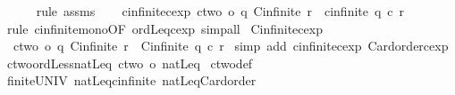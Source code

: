 \begin{isabellebody}
\ \ \ \ \isamarkupfalse%
\ {\isacharparenleft}{\kern0pt}rule\ assms{\isacharparenleft}{\kern0pt}{}{\isacharparenright}{\kern0pt}{\isacharparenright}{\kern0pt}\isanewline
\ \ \isamarkupfalse%
\isanewline
{}\isamarkupfalse%
%
\endisatagproof
{\isafoldproof}%
%
\isadelimproof
\isanewline
%
\endisadelimproof
\isanewline
{}\isamarkupfalse%
\ cinfinite{\isacharunderscore}{\kern0pt}cexp{\isacharcolon}{\kern0pt}\ {\isachardoublequoteopen}{\isasymlbrakk}ctwo\ {\isasymle}o\ q{\isacharsemicolon}{\kern0pt}\ Cinfinite\ r{\isasymrbrakk}\ {\isasymLongrightarrow}\ cinfinite\ {\isacharparenleft}{\kern0pt}q\ {\isacharcircum}{\kern0pt}c\ r{\isacharparenright}{\kern0pt}{\isachardoublequoteclose}\isanewline
%
\isadelimproof
%
\endisadelimproof
%
\isatagproof
{}\isamarkupfalse%
\ {\isacharparenleft}{\kern0pt}rule\ cinfinite{\isacharunderscore}{\kern0pt}mono{\isacharbrackleft}{\kern0pt}OF\ ordLeq{\isacharunderscore}{\kern0pt}cexp{}{\isacharbrackright}{\kern0pt}{\isacharparenright}{\kern0pt}\ simp{\isacharunderscore}{\kern0pt}all%
\endisatagproof
{\isafoldproof}%
%
\isadelimproof
\isanewline
%
\endisadelimproof
\isanewline
{}\isamarkupfalse%
\ Cinfinite{\isacharunderscore}{\kern0pt}cexp{\isacharcolon}{\kern0pt}\isanewline
\ \ {\isachardoublequoteopen}{\isasymlbrakk}ctwo\ {\isasymle}o\ q{\isacharsemicolon}{\kern0pt}\ Cinfinite\ r{\isasymrbrakk}\ {\isasymLongrightarrow}\ Cinfinite\ {\isacharparenleft}{\kern0pt}q\ {\isacharcircum}{\kern0pt}c\ r{\isacharparenright}{\kern0pt}{\isachardoublequoteclose}\isanewline
%
\isadelimproof
%
\endisadelimproof
%
\isatagproof
{}\isamarkupfalse%
\ {\isacharparenleft}{\kern0pt}simp\ add{\isacharcolon}{\kern0pt}\ cinfinite{\isacharunderscore}{\kern0pt}cexp\ Card{\isacharunderscore}{\kern0pt}order{\isacharunderscore}{\kern0pt}cexp{\isacharparenright}{\kern0pt}%
\endisatagproof
{\isafoldproof}%
%
\isadelimproof
\isanewline
%
\endisadelimproof
\isanewline
{}\isamarkupfalse%
\ ctwo{\isacharunderscore}{\kern0pt}ordLess{\isacharunderscore}{\kern0pt}natLeq{\isacharcolon}{\kern0pt}\ {\isachardoublequoteopen}ctwo\ {\isacharless}{\kern0pt}o\ natLeq{\isachardoublequoteclose}\isanewline
%
\isadelimproof
%
\endisadelimproof
%
\isatagproof
{}\isamarkupfalse%
\ ctwo{\isacharunderscore}{\kern0pt}def\ \isamarkupfalse%
\ finite{\isacharunderscore}{\kern0pt}UNIV\ natLeq{\isacharunderscore}{\kern0pt}cinfinite\ natLeq{\isacharunderscore}{\kern0pt}Card{\isacharunderscore}{\kern0pt}order\isanewline

\end{isabellebody}

